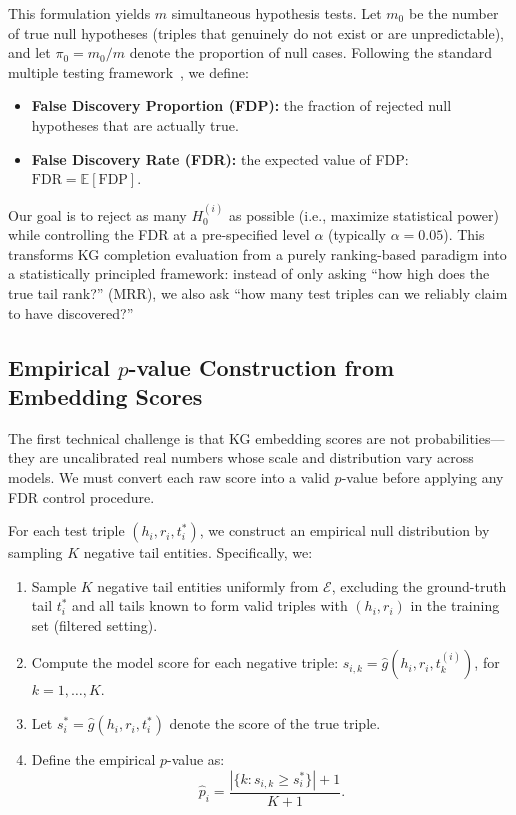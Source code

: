 This formulation yields $m$ simultaneous hypothesis tests. Let $m_0$ be the number of true null hypotheses (triples that genuinely do not exist or are unpredictable), and let $\pi_0 = m_0 / m$ denote the proportion of null cases.
Following the standard multiple testing framework~\cite{benjamini1995controlling, storey2002direct}, we define:
\begin{itemize}
    \item \textbf{False Discovery Proportion (FDP):} the fraction of rejected null hypotheses that are actually true.
    \item \textbf{False Discovery Rate (FDR):} the expected value of FDP: $\text{FDR} = \mathbb{E}[\text{FDP}]$.
\end{itemize}

Our goal is to reject as many $H_0^{(i)}$ as possible (i.e., maximize statistical power) while controlling the FDR at a pre-specified level $\alpha$ (typically $\alpha = 0.05$).
This transforms KG completion evaluation from a purely ranking-based paradigm into a statistically principled framework: instead of only asking ``how high does the true tail rank?'' (MRR), we also ask ``how many test triples can we reliably claim to have discovered?''

\subsection{Empirical $p$-value Construction from Embedding Scores}
\label{subsec:pvalue}

The first technical challenge is that KG embedding scores are not probabilities---they are uncalibrated real numbers whose scale and distribution vary across models.
We must convert each raw score into a valid $p$-value before applying any FDR control procedure.

For each test triple $(h_i, r_i, t^*_i)$, we construct an empirical null distribution by sampling $K$ negative tail entities.
Specifically, we:
\begin{enumerate}
    \item Sample $K$ negative tail entities uniformly from $\mathcal{E}$, excluding the ground-truth tail $t^*_i$ and all tails known to form valid triples with $(h_i, r_i)$ in the training set (filtered setting).
    \item Compute the model score for each negative triple: $s_{i,k} = \hat{g}(h_i, r_i, t^{(i)}_k)$, for $k = 1, \dots, K$.
    \item Let $s_i^* = \hat{g}(h_i, r_i, t^*_i)$ denote the score of the true triple.
    \item Define the empirical $p$-value as:
    \begin{equation}
        \hat{p}_i = \frac{|\{k : s_{i,k} \geq s_i^*\}| + 1}{K + 1}.
        \label{eq:pvalue}
    \end{equation}
\end{enumerate}

